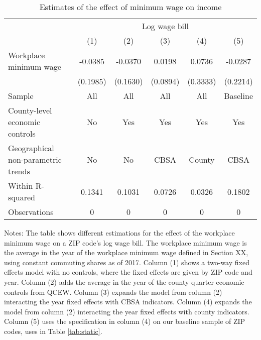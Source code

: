 \begin{table}[]
    \caption{Estimates of the effect of minimum wage on income}
    \label{tab:static_wages}

    \begin{tabular}{@{}lccccc@{}}
        \toprule
                                        & \multicolumn{5}{c}{Log wage bill}                         \\ \cmidrule(l){2-6} 
                                        & (1)       & (2)      & (3)      & (4)      & (5)          \\ \midrule
        Workplace minimum wage             & -0.0385    & -0.0370   & 0.0198   & 0.0736      & -0.0287     \\
                                        & (0.1985)  & (0.1630) & (0.0894) & (0.3333)    & (0.2214)   \\ \midrule
        Sample                             & All       & All      & All      & All       & Baseline     \\
        County-level economic controls     & No        & Yes      & Yes      & Yes       & Yes          \\
        Geographical non-parametric trends & No        & No       & CBSA     & County     & CBSA         \\
        Within R-squared                   & 0.1341   & 0.1031   & 0.0726   & 0.0326     & 0.1802        \\
        Observations                       & 0   & 0  & 0  & 0    & 0       \\ \bottomrule
    \end{tabular}
    
    \begin{minipage}{.95\textwidth} \footnotesize
        \vspace{2mm}
        Notes: The table shows different estimations for the effect of the workplace minimum 
        wage on a ZIP code's log wage bill.
        The workplace minimum wage is the average in the year of the workplace minimum wage 
        defined in Section XX, using constant commuting shares as of 2017.
        Column (1) shows a two-way fixed effects model with no controls, where the fixed 
        effects are given by ZIP code and year.
        Column (2) adds the average in the year of the county-quarter economic controls from
        QCEW.
        Column (3) expands the model from column (2) interacting the year fixed effects 
        with CBSA indicators.
        Column (4) expands the model from column (2) interacting the year fixed effects 
        with county indicators.
        Column (5) uses the specification in column (4) on our baseline sample of ZIP codes,
        uses in Table \ref{tab:static}.
    \end{minipage}
\end{table}


